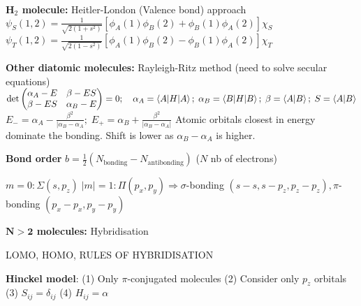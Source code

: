 \squishline

\begin{squishlist}
    \item \textbf{H$_2$ molecule:} Heitler-London (Valence bond) approach \\
    $\psi_S(1,2) = \frac{1}{\sqrt{2(1+s^2)}} \left[\phi_A(1)\phi_B(2) + \phi_B(1)\phi_A(2)\right] \chi_S$ \\
    $\psi_T(1,2) = \frac{1}{\sqrt{2(1-s^2)}} \left[\phi_A(1)\phi_B(2) - \phi_B(1)\phi_A(2)\right] \chi_T$
\end{squishlist}

\squishline

\begin{squishlist}
    \item \textbf{Other diatomic molecules:} Rayleigh-Ritz method (need to solve secular equations)\\
    $\det \begin{pmatrix}
        \alpha_A - E & \beta - ES \\
        \beta - ES   & \alpha_B - E
    \end{pmatrix} = 0; \quad \alpha_A = \braket{A|H|A};\; \alpha_B = \braket{B|H|B};\; \beta = \braket{A|B};\; S = \braket{A|B}$ \\
    $E_- = \alpha_A - \frac{\beta^2}{|\alpha_B - \alpha_A};\; E_+ = \alpha_B + \frac{\beta^2}{|\alpha_B - \alpha_A|}$ Atomic orbitals closest in energy dominate the bonding. Shift is lower as $\alpha_B - \alpha_A$ is higher.

    \item \textbf{Bond order} $b = \frac{1}{2} (N_{\text{bonding}} - N_{\text{antibonding}})$ ($N$ nb of electrons)
    
    \item $m=0 : \Sigma (s, p_z) \; |m|=1 : \Pi (p_x, p_y) \Longrightarrow \sigma$-bonding $(s-s, s-p_z, p_z-p_z), \pi$-bonding $(p_x-p_x, p_y-p_y)$
\end{squishlist}

\squishline

\begin{squishlist}
    \item \textbf{$\mathbf{N>2}$ molecules:} Hybridisation
    \item LOMO, HOMO, RULES OF HYBRIDISATION
    \item \textbf{Hinckel model}: (1) Only $\pi$-conjugated molecules (2) Consider only $p_z$ orbitals (3) $S_{ij} = \delta_{ij}$ (4) $H_{ij} = \alpha$
\end{squishlist}

